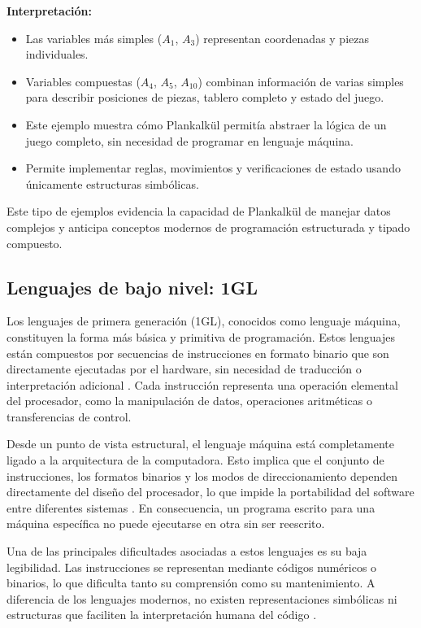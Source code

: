 \documentclass[12pt]{article}
\begin{document}
\noindent \textbf{Interpretación:} 
\begin{itemize}
	\item Las variables más simples ($A_1$, $A_3$) representan coordenadas y piezas individuales.
	\item Variables compuestas ($A_4$, $A_5$, $A_{10}$) combinan información de varias simples para describir posiciones de piezas, tablero completo y estado del juego.
	\item Este ejemplo muestra cómo Plankalkül permitía abstraer la lógica de un juego completo, sin necesidad de programar en lenguaje máquina.
	\item Permite implementar reglas, movimientos y verificaciones de estado usando únicamente estructuras simbólicas.
\end{itemize}

\noindent Este tipo de ejemplos evidencia la capacidad de Plankalkül de manejar datos complejos y anticipa conceptos modernos de programación estructurada y tipado compuesto.

\subsection{Lenguajes de bajo nivel: 1GL}

Los lenguajes de primera generación (1GL), conocidos como lenguaje máquina, constituyen la forma más básica y primitiva de programación. Estos lenguajes están compuestos por secuencias de instrucciones en formato binario que son directamente ejecutadas por el hardware, sin necesidad de traducción o interpretación adicional \cite{sebesta}. Cada instrucción representa una operación elemental del procesador, como la manipulación de datos, operaciones aritméticas o transferencias de control.

Desde un punto de vista estructural, el lenguaje máquina está completamente ligado a la arquitectura de la computadora. Esto implica que el conjunto de instrucciones, los formatos binarios y los modos de direccionamiento dependen directamente del diseño del procesador, lo que impide la portabilidad del software entre diferentes sistemas \cite{tanenbaum}. En consecuencia, un programa escrito para una máquina específica no puede ejecutarse en otra sin ser reescrito.

Una de las principales dificultades asociadas a estos lenguajes es su baja legibilidad. Las instrucciones se representan mediante códigos numéricos o binarios, lo que dificulta tanto su comprensión como su mantenimiento. A diferencia de los lenguajes modernos, no existen representaciones simbólicas ni estructuras que faciliten la interpretación humana del código \cite{stallings}.
\end{document}
